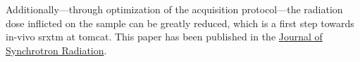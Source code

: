 Additionally---through optimization of the acquisition protocol---the radiation dose inflicted on the sample can be greatly reduced, which is a first step towards in-vivo \ac{srxtm} at \ac{tomcat}. This paper has been published in the \href{http://journals.iucr.org/s/}{Journal of Synchrotron Radiation}.